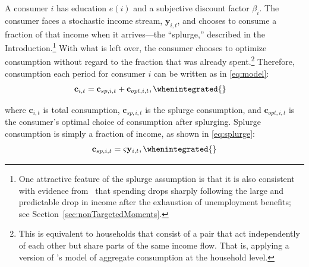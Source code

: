 \documentclass[\latexroot/\projectname]{subfiles}
\renewenvironment{verbatimwrite}[1]{\comment}{\endcomment}
\begin{document}
A consumer $i$ has education $e(i)$ and a subjective discount factor $\beta_i$. The consumer faces a stochastic income stream, $\mathbf{y}_{i,t}$, and chooses to consume a fraction of that income when it arrives---the ``splurge,'' described in the Introduction.\footnote{One attractive feature of the splurge assumption is that it is also consistent with evidence from~\cite{ganongConsumer2019} that spending drops sharply following the large and predictable drop in income after the exhaustion of unemployment benefits; see Section~\ref{sec:nonTargetedMoments}.} With what is left over, the consumer chooses to optimize consumption without regard to the fraction that was already spent.\footnote{This is equivalent to households that consist of a pair that act independently of each other but share parts of the same income flow. That is, applying a version of \citet{campbell1989consumption}'s model of aggregate consumption at the household level.} Therefore, consumption each period for consumer $i$ can be written as in \eqref{eq:model}:
\begin{verbatimwrite}{\eqns/splurge.ltx}
  \begin{equation}
    \begin{gathered}
      \begin{aligned}
        \mathbf{c}_{i,t} & = \mathbf{c}_{sp,i,t} + \mathbf{c}_{opt,i,t}, \whenintegrated{\label{eq:model}} %
      \end{aligned}
    \end{gathered}
  \end{equation}
\end{verbatimwrite}

{\noindent}where $\mathbf{c}_{i,t}$ is total consumption, $\mathbf{c}_{sp,i,t}$ is the splurge consumption, and $\mathbf{c}_{opt,i,t}$ is the consumer's optimal choice of consumption after splurging.
Splurge consumption is simply a fraction of income, as shown in \eqref{eq:splurge}:
\begin{equation}
  \begin{gathered}
    \begin{aligned}
      \mathbf{c}_{sp,i,t} = \varsigma \mathbf{y}_{i,t},
      \whenintegrated{\label{eq:splurge}} %
    \end{aligned}
  \end{gathered}
\end{equation}
\end{document}
